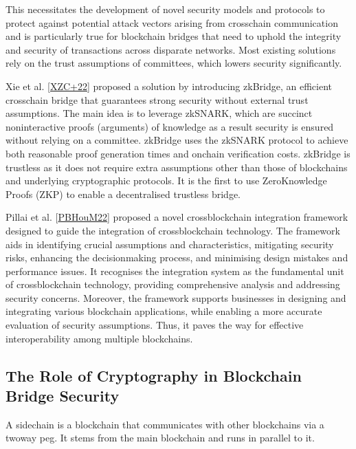 \documentclass[letterpaper,10pt,english]{jupyterBook}
\begin{document}
\sphinxAtStartPar
This necessitates the development of novel security models and protocols to protect against potential attack vectors arising from cross\sphinxhyphen{}chain communication and is particularly true for blockchain bridges that need to uphold the integrity and security of transactions across disparate networks. Most existing solutions rely on the trust assumptions of committees, which lowers security significantly.

\sphinxAtStartPar
Xie et al. {[}\hyperlink{cite.BBSecurity/bbsecurity:id97}{XZC+22}{]} proposed a solution by introducing zkBridge, an efficient cross\sphinxhyphen{}chain bridge that guarantees strong security without external trust assumptions. The main idea is to leverage zk\sphinxhyphen{}SNARK, which are succinct non\sphinxhyphen{}interactive proofs (arguments) of knowledge as a result security is ensured without relying on a committee. zkBridge uses the zk\sphinxhyphen{}SNARK protocol to achieve both reasonable proof generation times and on\sphinxhyphen{}chain verification costs. zkBridge is trustless as it does not require extra assumptions other than those of blockchains and underlying cryptographic protocols. It is the first to use Zero\sphinxhyphen{}Knowledge Proofs (ZKP) to enable a decentralised trustless bridge.

\sphinxAtStartPar
Pillai et al. {[}\hyperlink{cite.BBSecurity/bbsecurity:id99}{PBHouM22}{]} proposed a novel cross\sphinxhyphen{}blockchain integration framework designed to guide the integration of cross\sphinxhyphen{}blockchain technology. The framework aids in identifying crucial assumptions and characteristics, mitigating security risks, enhancing the decision\sphinxhyphen{}making process, and minimising design mistakes and performance issues. It recognises the integration system as the fundamental unit of cross\sphinxhyphen{}blockchain technology, providing comprehensive analysis and addressing security concerns. Moreover, the framework supports businesses in designing and integrating various blockchain applications, while enabling a more accurate evaluation of security assumptions. Thus, it paves the way for effective interoperability among multiple blockchains.


\subsection{The Role of Cryptography in Blockchain Bridge Security}
\label{\detokenize{BBSecurity/bbsecurity:the-role-of-cryptography-in-blockchain-bridge-security}}
\begin{sphinxShadowBox}

\sphinxAtStartPar
A sidechain is a blockchain that communicates with other blockchains via a two\sphinxhyphen{}way peg. It stems from the main blockchain and runs in parallel to it.
\end{sphinxShadowBox}
\end{document}
